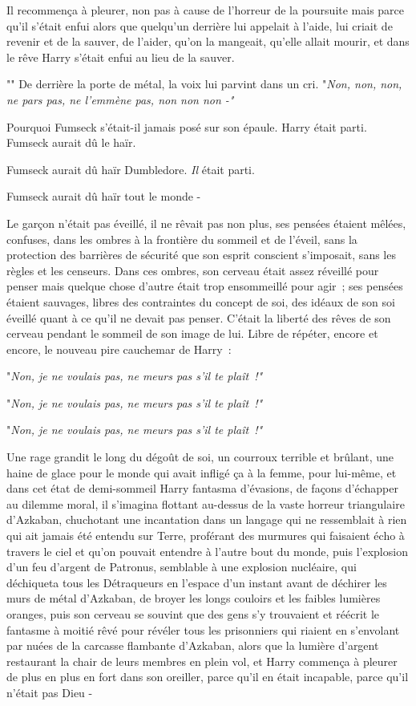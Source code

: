 Il recommença à pleurer, non pas à cause de l'horreur de la poursuite mais parce qu'il s'était enfui alors que quelqu'un derrière lui appelait à l'aide, lui criait de revenir et de la sauver, de l'aider, qu'on la mangeait, qu'elle allait mourir, et dans le rêve Harry s'était enfui au lieu de la sauver.

"" De derrière la porte de métal, la voix lui parvint dans un cri. "\emph{Non, non, non, ne pars pas, ne l'emmène pas, non non non -"}

Pourquoi Fumseck s'était-il jamais posé sur son épaule. Harry était parti. Fumseck aurait dû le haïr.

Fumseck aurait dû haïr Dumbledore. \emph{Il} était parti.

Fumseck aurait dû haïr tout le monde -

Le garçon n'était pas éveillé, il ne rêvait pas non plus, ses pensées étaient mêlées, confuses, dans les ombres à la frontière du sommeil et de l'éveil, sans la protection des barrières de sécurité que son esprit conscient s'imposait, sans les règles et les censeurs. Dans ces ombres, son cerveau était assez réveillé pour penser mais quelque chose d'autre était trop ensommeillé pour agir~; ses pensées étaient sauvages, libres des contraintes du concept de soi, des idéaux de son soi éveillé quant à ce qu'il ne devait pas penser. C'était la liberté des rêves de son cerveau pendant le sommeil de son image de lui. Libre de répéter, encore et encore, le nouveau pire cauchemar de Harry~:

"\emph{Non, je ne voulais pas, ne meurs pas s'il te plaît~!"}

"\emph{Non, je ne voulais pas, ne meurs pas s'il te plaît~!"}

"\emph{Non, je ne voulais pas, ne meurs pas s'il te plaît~!"}

Une rage grandit le long du dégoût de soi, un courroux terrible et brûlant, une haine de glace pour le monde qui avait infligé ça à la femme, pour lui-même, et dans cet état de demi-sommeil Harry fantasma d'évasions, de façons d'échapper au dilemme moral, il s'imagina flottant au-dessus de la vaste horreur triangulaire d'Azkaban, chuchotant une incantation dans un langage qui ne ressemblait à rien qui ait jamais été entendu sur Terre, proférant des murmures qui faisaient écho à travers le ciel et qu'on pouvait entendre à l'autre bout du monde, puis l'explosion d'un feu d'argent de Patronus, semblable à une explosion nucléaire, qui déchiqueta tous les Détraqueurs en l'espace d'un instant avant de déchirer les murs de métal d'Azkaban, de broyer les longs couloirs et les faibles lumières oranges, puis son cerveau se souvint que des gens s'y trouvaient et réécrit le fantasme à moitié rêvé pour révéler tous les prisonniers qui riaient en s'envolant par nuées de la carcasse flambante d'Azkaban, alors que la lumière d'argent restaurant la chair de leurs membres en plein vol, et Harry commença à pleurer de plus en plus en fort dans son oreiller, parce qu'il en était incapable, parce qu'il n'était pas Dieu -

